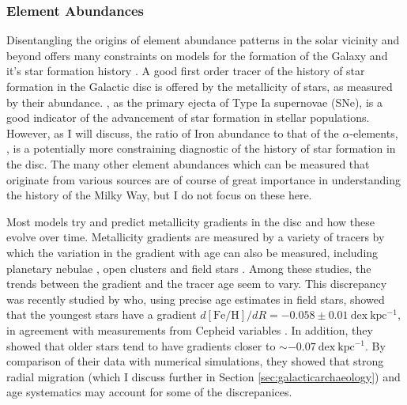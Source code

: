 \subsubsection{Element Abundances}
\label{sec:discabundances}
Disentangling the origins of element abundance patterns in the solar vicinity and beyond offers many constraints on models for the formation of the Galaxy and it's star formation history \citep[a seminal review on the goals of this effort is given by][]{2002ARA&A..40..487F}. A good first order tracer of the history of star formation in the Galactic disc is offered by the metallicity of stars, as measured by their \feh{} abundance. \feh{}, as the primary ejecta of Type Ia supernovae (SNe), is a good indicator of the advancement of star formation in stellar populations. However, as I will discuss, the ratio of Iron abundance to that of the $\alpha$-elements, \afe{}, is a potentially more constraining diagnostic of the history of star formation in the disc. The many other element abundances which can be measured that originate from various sources are of course of great importance in understanding the history of the Milky Way, but I do not focus on these here.

Most models try and predict metallicity gradients in the disc and how these evolve over time. Metallicity gradients are measured by a variety of tracers by which the variation in the gradient with age can also be measured, including planetary nebulae \citep[e.g.][]{1994A&A...282..436M,1994Ap&SS.219..231M,2010ApJ...714.1096S,2011ApJ...738...27B}, open clusters \citep[e.g.][]{1998MNRAS.296.1045C,2002AJ....124.2693F,2004A&A...414..163S,2009A&A...494...95M,2016AN....337..922C} and field stars \citep[e.g][]{2004A&A...418..989N,2014A&A...566A..37G}. Among these studies, the trends between the \feh{} gradient and the tracer age seem to vary. This discrepancy was recently studied by \citet{2016arXiv160804951A} who, using precise age estimates in field stars, showed that the youngest stars have a gradient $d\mathrm{[Fe/H]}/dR = -0.058\pm 0.01\ \mathrm{dex\ kpc^{-1}}$, in agreement with measurements from Cepheid variables \citep{2014A&A...566A..37G}. In addition, they showed that older stars tend to have gradients closer to $\sim -0.07\ \mathrm{dex\ kpc^{-1}}$. By comparison of their data with numerical simulations, they showed that strong radial migration (which I discuss further in Section \ref{sec:galacticarchaeology}) and age systematics may account for some of the discrepanices.

